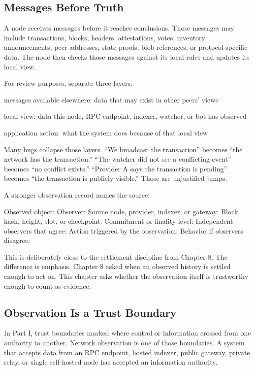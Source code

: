 \subsection{Messages Before Truth}

A node receives messages before it reaches conclusions. Those messages may include transactions, blocks, headers, attestations, votes, inventory announcements, peer addresses, state proofs, blob references, or protocol-specific data. The node then checks those messages against its local rules and updates its local view.

For review purposes, separate three layers:

\begin{codeblock}
messages available elsewhere:
    data that may exist in other peers' views

local view:
    data this node, RPC endpoint, indexer, watcher, or bot has observed

application action:
    what the system does because of that local view
\end{codeblock}

Many bugs collapse those layers. ``We broadcast the transaction'' becomes ``the network has the transaction.'' ``The watcher did not see a conflicting event'' becomes ``no conflict exists.'' ``Provider A says the transaction is pending'' becomes ``the transaction is publicly visible.'' Those are unjustified jumps.

A stronger observation record names the source:

\begin{codeblock}
Observed object:
Observer:
Source node, provider, indexer, or gateway:
Block hash, height, slot, or checkpoint:
Commitment or finality level:
Independent observers that agree:
Action triggered by the observation:
Behavior if observers disagree:
\end{codeblock}

This is deliberately close to the settlement discipline from Chapter 8. The difference is emphasis. Chapter 8 asked when an observed history is settled enough to act on. This chapter asks whether the observation itself is trustworthy enough to count as evidence.

\subsection{Observation Is a Trust Boundary}

In Part I, trust boundaries marked where control or information crossed from one authority to another. Network observation is one of those boundaries. A system that accepts data from an RPC endpoint, hosted indexer, public gateway, private relay, or single self-hosted node has accepted an information authority.

